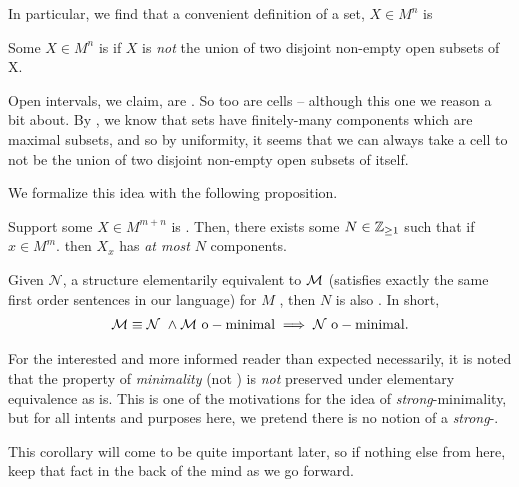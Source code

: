 In particular, we find that a convenient definition of a  set, $X \in M^n$ is

\begin{definition}
  Some $X \in M^n$ is  if $X$ is \emph{not} the union of two disjoint non-empty  open subsets of X.
\end{definition}


\begin{example}
  Open intervals, we claim, are . So too are cells -- although this one we reason a bit about. By \CD, we know that  sets have finitely-many  components which are maximal  \cnctd subsets, and so by uniformity, it seems that we can always take a cell to not be the union of two disjoint non-empty  open subsets of itself.

\end{example}

We formalize this idea with the following proposition.

\begin{proposition}
  \label{prop:dfnblycnctd}
  Support some $X \in M^{m + n}$ is . Then, there exists some $N \in \mathbb{Z}_{\geq 1}$ such that if $x \in M^m$. then $X_x$ has \emph{at most} $N$  components.
\end{proposition}

\begin{corollary}
  Given $\mathcal{N}$, a structure elementarily equivalent to $\mathcal{M}$ (satisfies exactly the same first order sentences in our language) for $M$ \om, then $N$ is also \om. In short,
  \begin{align*}
    \mathcal{M} \equiv \mathcal{N} \ \wedge \mathcal{M} \ \mathrm{o-minimal} \implies \mathcal{N} \ \mathrm{o-minimal}.
  \end{align*}
\end{corollary}

\begin{svgraybox}
  For the interested and more informed reader than expected necessarily, it is noted that the property of \emph{minimality} (not \om) is \emph{not} preserved under elementary equivalence as \om is. This is one of the motivations for the idea of \emph{strong}-minimality, but for all intents and purposes here, we pretend there is no notion of a \emph{strong}-\om.
\end{svgraybox}

This corollary will come to be quite important later, so if nothing else from here, keep that fact in the back of the mind as we go forward.

